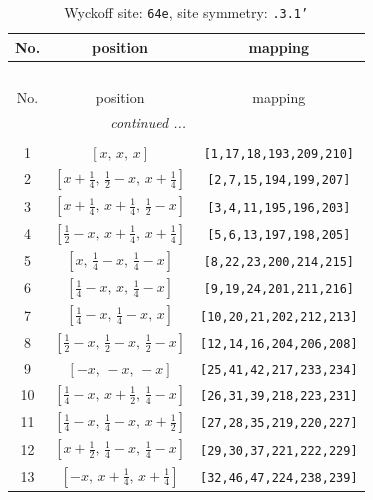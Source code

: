 \documentclass[fleqn,8pt]{jsarticle}
\begin{document}
\begin{longtable}{ccc}
\caption{Wyckoff site: {\tt 64e}, site symmetry: {\tt .3.1'}}
 \\
 \hline \hline
No. & position & mapping \\ \hline \endfirsthead

\multicolumn{2}{l}{\tablename\ \thetable{}} \\
 \hline \hline
No. & position & mapping \\ \hline \endhead

 \hline \hline
\multicolumn{2}{r}{\footnotesize\it continued ...} \\ \endfoot

 \hline \hline
\multicolumn{2}{r}{} \\ \endlastfoot

1 & $\left[ x,\, x,\, x \right]$ & {\tt [1,17,18,193,209,210]} \\ \hline
2 & $\left[ x + \frac{1}{4},\, \frac{1}{2} - x,\, x + \frac{1}{4} \right]$ & {\tt [2,7,15,194,199,207]} \\ \hline
3 & $\left[ x + \frac{1}{4},\, x + \frac{1}{4},\, \frac{1}{2} - x \right]$ & {\tt [3,4,11,195,196,203]} \\ \hline
4 & $\left[ \frac{1}{2} - x,\, x + \frac{1}{4},\, x + \frac{1}{4} \right]$ & {\tt [5,6,13,197,198,205]} \\ \hline
5 & $\left[ x,\, \frac{1}{4} - x,\, \frac{1}{4} - x \right]$ & {\tt [8,22,23,200,214,215]} \\ \hline
6 & $\left[ \frac{1}{4} - x,\, x,\, \frac{1}{4} - x \right]$ & {\tt [9,19,24,201,211,216]} \\ \hline
7 & $\left[ \frac{1}{4} - x,\, \frac{1}{4} - x,\, x \right]$ & {\tt [10,20,21,202,212,213]} \\ \hline
8 & $\left[ \frac{1}{2} - x,\, \frac{1}{2} - x,\, \frac{1}{2} - x \right]$ & {\tt [12,14,16,204,206,208]} \\ \hline
9 & $\left[ - x,\, - x,\, - x \right]$ & {\tt [25,41,42,217,233,234]} \\ \hline
10 & $\left[ \frac{1}{4} - x,\, x + \frac{1}{2},\, \frac{1}{4} - x \right]$ & {\tt [26,31,39,218,223,231]} \\ \hline
11 & $\left[ \frac{1}{4} - x,\, \frac{1}{4} - x,\, x + \frac{1}{2} \right]$ & {\tt [27,28,35,219,220,227]} \\ \hline
12 & $\left[ x + \frac{1}{2},\, \frac{1}{4} - x,\, \frac{1}{4} - x \right]$ & {\tt [29,30,37,221,222,229]} \\ \hline
13 & $\left[ - x,\, x + \frac{1}{4},\, x + \frac{1}{4} \right]$ & {\tt [32,46,47,224,238,239]} \\ \hline

\end{longtable}
\end{document}
